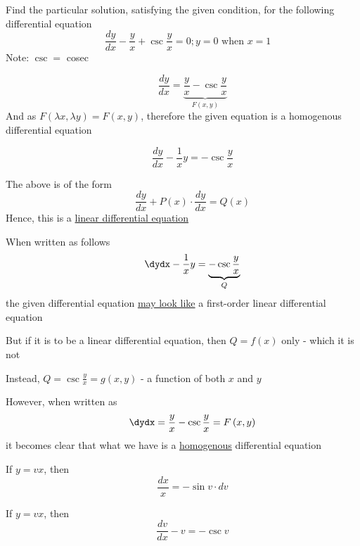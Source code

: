 \documentclass[14pt,fleqn]{extarticle}
\begin{document}
\begin{problem}
\statement
	
Find the particular solution, satisfying the 
given condition, for the following differential
equation
\[ \quad\frac{dy}{dx} -\frac{y}{x} + \csc\frac{y}{x} = 0 ; y = 0\text{ when }  x = 1 \] 
Note: $\csc =$ cosec
%
\begin{step}
	\begin{options}
		\correct

\[ \qquad \frac{dy}{dx} = \underbrace{\frac{y}{x} - \csc\frac{y}{x}}_{F(x,y)}\]
And as $F \left(\lambda x,\lambda y \right) = F(x,y)$, therefore the given equation is a homogenous differential equation 

		\incorrect

\[ \qquad \frac{dy}{dx} - \frac{1}{x}y =  - \csc\frac{y}{x} \]

The above is of the form 
\[ \qquad \frac{dy}{dx} + P(x)\cdot\frac{dy}{dx} = Q(x) \]
Hence, this is a \underline{linear differential equation}

	\end{options}
	\reason
	
	When written as follows
	\[ \qquad \dydx - \frac{1}{x}y = \underbrace{-\csc\frac{y}{x}}_{Q} \]
	the given differential equation \underline{may look like} a 
	first-order linear differential equation\newline 
	
	But if it is to be a linear differential equation, then $Q = f(x)$ only - which it is not \newline 
	
Instead, $Q = \csc\frac{y}{x} = g \left(x,y \right)$ -  a function of both $x$ and $y$ \newline 

However, when written as 
\[ \qquad \dydx = \frac{y}{x} - \csc\frac{y}{x} = F \left(x,y \right)\]
it becomes clear that what we have is a \underline{homogenous} differential equation
\end{step}
\begin{step}
	\begin{options}
		\correct
		
		If $ y = vx$, then 
		\[\qquad \frac{dx}{x} = -\sin v\cdot dv\]

		\incorrect
		
		If $ y = vx$, then 
		\[\qquad \frac{dv}{dx} - v = -\csc v\]

	\end{options}
	\reason


\end{step}
\end{problem}
\end{document}
